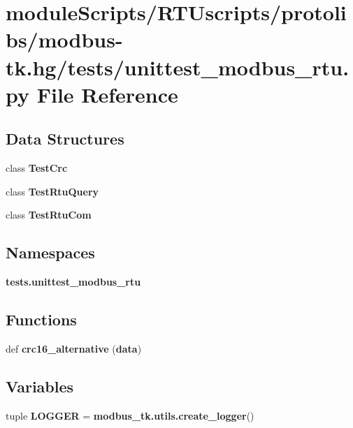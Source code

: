 \section{module\+Scripts/\+R\+T\+Uscripts/protolibs/modbus-\/tk.hg/tests/unittest\+\_\+modbus\+\_\+rtu.py File Reference}
\label{unittest__modbus__rtu_8py}
\subsection*{Data Structures}
\begin{DoxyCompactItemize}
\item 
class {\bf Test\+Crc}
\item 
class {\bf Test\+Rtu\+Query}
\item 
class {\bf Test\+Rtu\+Com}
\end{DoxyCompactItemize}
\subsection*{Namespaces}
\begin{DoxyCompactItemize}
\item 
 {\bf tests.\+unittest\+\_\+modbus\+\_\+rtu}
\end{DoxyCompactItemize}
\subsection*{Functions}
\begin{DoxyCompactItemize}
\item 
def {\bf crc16\+\_\+alternative} ({\bf data})
\end{DoxyCompactItemize}
\subsection*{Variables}
\begin{DoxyCompactItemize}
\item 
tuple {\bf L\+O\+G\+G\+E\+R} = {\bf modbus\+\_\+tk.\+utils.\+create\+\_\+logger}()
\end{DoxyCompactItemize}
